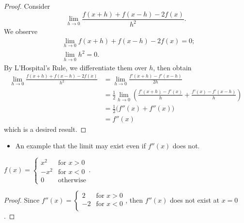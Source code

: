 \begin{Exercise}
\begin{proof}
Consider
$$
\lim_{h\to 0}\frac{f(x+h) + f(x-h) -2f(x)}{h^2}.
$$
We observe
\begin{align*}
&\lim_{h\to 0}f(x+h)+f(x-h)-2f(x) = 0; \\
&\lim_{h\to 0}h^2 =0.
\end{align*}
By L'Hospital's Rule, we differentiate them over $h$, then obtain
\begin{align*}
\lim_{h\to 0}\frac{f(x+h) + f(x-h) -2f(x)}{h^2}
&= \lim_{h\to 0}\frac{f'(x+h) - f'(x-h)}{2h} \\
&= \frac{1}{2} \lim_{h\to 0}\left( \frac{f'(x+h)-f'(x)}{h} + \frac{f'(x) - f'(x-h)}{h} \right)\\
&= \frac{1}{2} \big(f''(x) + f''(x) \big) \\
&= f''(x)
\end{align*}
which is a desired result.
\end{proof}
\begin{itemize}
\item An example that the limit may exist even if $f''(x)$ does not.
\end{itemize}
\begin{answer}
$f(x) = \begin{cases}
x^2 & \mbox{for } x > 0 \\
-x^2 & \mbox{for } x < 0 \\
0 & \mbox{otherwise}
\end{cases}$.
\end{answer}
\begin{proof}
Since $f''(x) = \begin{cases}
2 & \mbox{for } x> 0 \\
-2 & \mbox{for } x<0 \\
\end{cases}$, then $f''(x)$ does not exist at $x=0$.
\end{proof}
\end{Exercise}